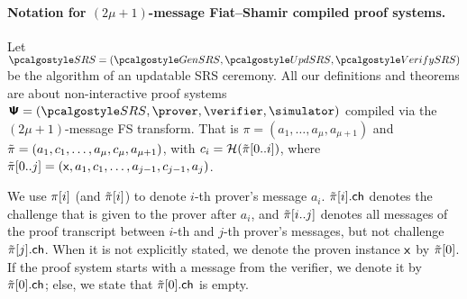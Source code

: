 \paragraph{Notation for $(2\mu + 1)$-message Fiat--Shamir compiled proof systems.}
Let $\SRScer= (\kgen,\upd, \verifyCRS)$ be the algorithm of an updatable SRS ceremony.
All our definitions and theorems are about non-interactive proof systems $\ps = (\SRScer, \prover, \verifier, \simulator)$ compiled via the $(2\mu + 1)$-message FS transform. 
%
That is $\pi = (a_1, \ldots, a_{\mu}, a_{\mu + 1})$ and $\tilde{\pi} = (a_1, c_1, \ldots, a_{\mu}, c_{\mu}, a_{\mu + 1})$, with $c_i
= \mathcal{H}(\tilde{\pi}[0..i])$, where $\tilde{\pi}[0..j] = (\mathsf{x}, a_1, c_1, \ldots,
a_{j - 1}, c_{j - 1}, a_j)$.

 We use $\pi[i]$ (and $\tilde{\pi}[i]$) to denote $i$-th prover's
message $a_i$. $\tilde{\pi}[i].\mathsf{ch}$ denotes the challenge that is given to the prover after $a_i$, and $\tilde{\pi}[i..j]$ denotes all messages of the proof transcript 
between $i$-th and $j$-th prover's messages, but not challenge
$\tilde{\pi}[j].\mathsf{ch}$. When it is not explicitly stated, we denote the proven instance
$\mathsf{x}$ by $\tilde{\pi}[0]$. If the proof system starts with a message from the verifier,
we denote it by $\tilde{\pi}[0].\mathsf{ch}$; else, we state that $\tilde{\pi}[0].\mathsf{ch}$ is empty.


